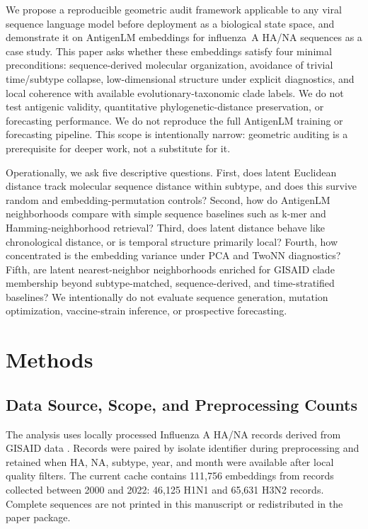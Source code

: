 \documentclass[11pt]{article}
\begin{document}
We propose a reproducible geometric audit framework applicable to any viral sequence language model before deployment as a biological state space, and demonstrate it on AntigenLM embeddings for influenza~A HA/NA sequences as a case study. This paper asks whether these embeddings satisfy four minimal preconditions: sequence-derived molecular organization, avoidance of trivial time/subtype collapse, low-dimensional structure under explicit diagnostics, and local coherence with available evolutionary-taxonomic clade labels. We do not test antigenic validity, quantitative phylogenetic-distance preservation, or forecasting performance. We do not reproduce the full AntigenLM training or forecasting pipeline. This scope is intentionally narrow: geometric auditing is a prerequisite for deeper work, not a substitute for it.

Operationally, we ask five descriptive questions. First, does latent Euclidean distance track molecular sequence distance within subtype, and does this survive random and embedding-permutation controls? Second, how do AntigenLM neighborhoods compare with simple sequence baselines such as k-mer and Hamming-neighborhood retrieval? Third, does latent distance behave like chronological distance, or is temporal structure primarily local? Fourth, how concentrated is the embedding variance under PCA and TwoNN diagnostics? Fifth, are latent nearest-neighbor neighborhoods enriched for GISAID clade membership beyond subtype-matched, sequence-derived, and time-stratified baselines? We intentionally do not evaluate sequence generation, mutation optimization, vaccine-strain inference, or prospective forecasting.

\section{Methods}

\subsection{Data Source, Scope, and Preprocessing Counts}

The analysis uses locally processed Influenza A HA/NA records derived from GISAID data \cite{shu2017gisaid}. Records were paired by isolate identifier during preprocessing and retained when HA, NA, subtype, year, and month were available after local quality filters. The current cache contains 111,756 embeddings from records collected between 2000 and 2022: 46,125 H1N1 and 65,631 H3N2 records. Complete sequences are not printed in this manuscript or redistributed in the paper package.
\end{document}
